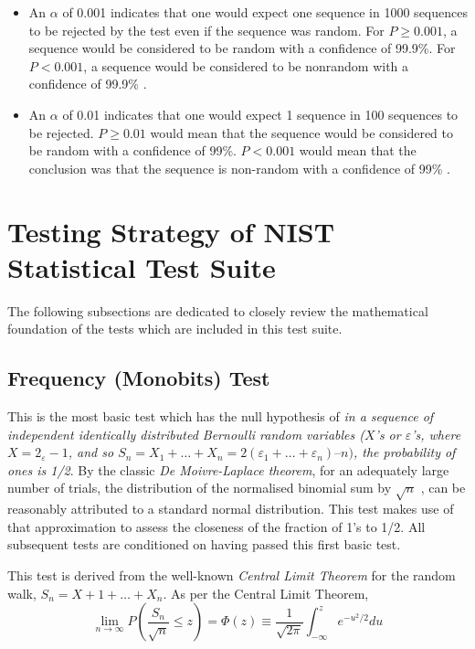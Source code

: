 \begin{itemize}
    \item An $\alpha$ of 0.001 indicates that one would expect one sequence in 1000 sequences to be rejected by the test even if the sequence was random. For $P \geq 0.001$, a sequence would be considered to be random with a confidence of 99.9\%. For $P < 0.001$, a sequence would be considered to be nonrandom with a confidence of 99.9\% \cite{rep_nist_sp_80022}.
    
    \item An $\alpha$ of 0.01 indicates that one would expect 1 sequence in 100 sequences to be rejected. $P \geq 0.01$ would mean that the sequence would be considered to be random with a confidence of 99\%. $P < 0.001$ would mean that the conclusion was that the sequence is non-random with a confidence of 99\% \cite{rep_nist_sp_80022}.
\end{itemize}

\section{Testing Strategy of NIST Statistical Test Suite}

The following subsections are dedicated to closely review the mathematical foundation of the tests which are included in this test suite.

\subsection{Frequency (Monobits) Test}\label{subsec:monobits}

This is the most basic test which has the null hypothesis of \textit{in a sequence of independent identically distributed Bernoulli random variables ($X$'s or $\varepsilon$'s, where $X =2_{\varepsilon}-1$, and so $S_n = X_1 + \ldots + X_n = 2(\varepsilon_1 + \ldots + \varepsilon_n) – n)$, the probability of ones is 1/2}. By the classic \textit{De Moivre-Laplace theorem}, for an adequately large number of trials, the distribution of the normalised binomial sum by $\sqrt{n}$ , can be reasonably attributed to a standard normal distribution. This test makes use of that approximation to assess the closeness of the fraction of 1's to 1/2. All subsequent tests are conditioned on having passed this first basic test.

This test is derived from the well-known \textit{Central Limit Theorem} for the random walk, $S_n = X+1 + \ldots + X_n$. As per the Central Limit Theorem,
\[
    \lim_{n\to\infty} P(\dfrac{S_n}{\sqrt{n}} \leq z) = \Phi(z) \equiv \dfrac{1}{\sqrt{2\pi}}\int_{-\infty}^{z}e^{-u^2/2} du
\]

